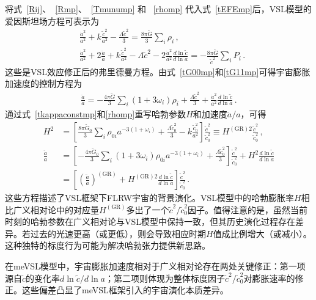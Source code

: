 \documentclass[jkps,preprint,fleqn]{revtex4}
\newcommand{\tc}{\tilde{c}}
\newcommand{\tG}{\tilde{G}}
\newcommand{\GR}{\text{GR}}
\begin{document}
\begin{CJK*}{UTF8}{gbsn}
将式~\eqref{Rij}、~\eqref{Rmp}、~\eqref{Tmunump} 和 ~\eqref{rhomp} 代入式~\eqref{tEFEmp}后，VSL模型的爱因斯坦场方程可表示为
\begin{align}
 &\frac{\dot{a}^2}{a^2} + k \frac{\tc^2}{a^2}  -\frac{ \Lambda \tc^2}{3} = \frac{8 \pi \tG}{3} \sum_i \rho_i \label{tG00mp} \,, \\
 &\frac{\dot{a}^2}{a^2} + 2 \frac{\ddot{a}}{a} +  k \frac{\tc^2}{a^2} - \Lambda \tc^2 - 2 \frac{\dot{a}^2}{a^2} \frac{d \ln \tc}{d \ln a} = -\frac{8 \pi \tG}{\tc^2} \sum_{i} P_i  \label{tG11mp} \,.
 \end{align}
这些是VSL效应修正后的弗里德曼方程。由式~\eqref{tG00mp}和\eqref{tG11mp}可得宇宙膨胀加速度的控制方程为
\begin{align}
 \frac{\ddot{a}}{a} = -\frac{4\pi \tG}{3} \sum_i \left( 1 + 3 \omega_i \right) \rho_i  + \frac{\Lambda \tc^2}{3} + \frac{\dot{a}^2}{a^2} \frac{d \ln \tc}{d \ln a} \label{t3G11mG00mp} \,.
 \end{align}
通过式~\eqref{tkappaconstmp}和\eqref{rhomp}重写哈勃参数$H$和加速度$\ddot{a}/a$，可得
\begin{align}
 H^2 &= \left[ \frac{8 \pi \tG_0}{3} \sum_{i} \rho_{0i} a^{-3(1+\omega_i)} + \frac{ \Lambda \tc_0^2}{3} - k \frac{\tc_0^2}{a^2} \right] \frac{\tc^2}{\tc_0^2} \equiv H^{(\GR)2} \frac{\tc^2}{\tc_0^2} \label{H2me} \,, \\
 \frac{\ddot{a}}{a} &= \left[ -\frac{4\pi \tG_0}{3} \sum_i \left( 1 + 3 \omega_i \right) \rho_{0i} a^{-3(1+\omega_i)} + \frac{\Lambda \tc_0^2}{3} \right] \frac{\tc^2}{\tc_0^2} + H^2 \frac{d \ln \tc}{d \ln a} \nonumber \\
 &= \left[ \left( \frac{\ddot{a}}{a} \right)^{(\GR)} +  H^{(\GR)2} \frac{d \ln \tc}{d \ln a}  \right] \frac{\tc^2}{\tc_0^2} \label{ddotaoa} \,.
 \end{align}
这些方程描述了VSL框架下FLRW宇宙的背景演化。VSL模型中的哈勃膨胀率$H$相比广义相对论中的对应量$H^{(\GR)}$多出了一个$\tc^2/\tc_0^2$因子。值得注意的是，虽然当前时刻的哈勃参数在广义相对论与VSL模型中保持一致，但其历史演化过程存在差异。若过去的光速更高（或更低），则会导致相应时期$H$值成比例增大（或减小）。这种独特的标度行为可能为解决哈勃张力提供新思路。

在meVSL模型中，宇宙膨胀加速度相对于广义相对论存在两处关键修正：第一项源自$\tc$的变化率$d \ln \tc/d \ln a$；第二项则体现为整体标度因子$\tc^2/\tc_0^2$对膨胀速率的修正。这些偏差凸显了meVSL框架引入的宇宙演化本质差异。


\end{CJK*}
\end{document}
